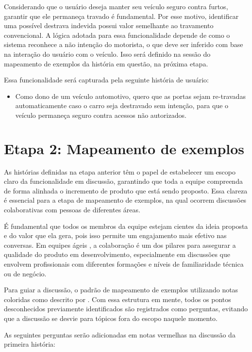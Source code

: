 Considerando que o usuário deseja manter seu veículo seguro contra furtos, garantir que ele permaneça travado é fundamental. Por esse motivo, identificar uma possível 
destrava indevida possui valor semelhante ao travamento convencional. A lógica adotada para essa funcionalidade depende de como o sistema reconhece a não intenção 
do motorista, o que deve ser inferido com base na interação do usuário com o veículo. Isso será definido na sessão do mapeamento de exemplos da história em questão, 
na próxima etapa.

Essa funcionalidade será capturada pela seguinte história de usuário:

\begin{itemize}
    \item Como dono de um veículo automotivo, quero que as portas sejam re-travadas automaticamente caso o carro seja destravado sem intenção, para que o veículo permaneça seguro contra acessos não autorizados.
\end{itemize}

\section{\textbf{Etapa 2: Mapeamento de exemplos}}
As histórias definidas na etapa anterior têm o papel de estabelecer um escopo claro da funcionalidade em discussão, garantindo que toda a equipe compreenda de forma 
alinhada o incremento de produto que está sendo proposto. Essa clareza é essencial para a etapa de mapeamento de exemplos, na qual ocorrem discussões colaborativas 
com pessoas de diferentes áreas.

É fundamental que todos os membros da equipe estejam cientes da ideia proposta e do valor que ela gera, pois isso permite um engajamento mais efetivo nas conversas. 
Em equipes ágeis \cite{atlassianAgileTeams}, a colaboração é um dos pilares para assegurar a qualidade do produto em desenvolvimento, especialmente em discussões que 
envolvem profissionais com diferentes formações e níveis de familiaridade técnica ou de negócio.

Para guiar a discussão, o padrão de mapeamento de exemplos utilizando notas coloridas como descrito por . Com essa estrutura em mente, 
todos os pontos desconhecidos previamente identificados são registrados como perguntas, evitando que a discussão se desvie para tópicos fora do escopo naquele momento. 

As seguintes perguntas serão adicionadas em notas vermelhas na discussão da primeira história:

